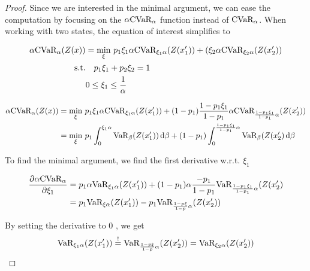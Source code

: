\begin{proof}
Since we are interested in the minimal argument, we can ease the computation by focusing on the $\alpha\text{CVaR}_\alpha$ function instead of $\text{CVaR}_\alpha$.
When working with two states, the equation of interest simplifies to

\begin{equation}\label{eqn:cvardecomp2}
\begin{split}
\alpha\text{CVaR}_\alpha(Z(x))&=\min_{\xi} \, p_1\xi_1\alpha \text{CVaR}_{\xi_1\alpha}(Z(x_1')) + (\xi_2\alpha\text{CVaR}_{\xi_2\alpha}(Z(x_2'))\\
\text{s.t.}& \quad p_1\xi_1 + p_2\xi_2 = 1\\
& 0 \le \xi_1 \le \frac{1}{\alpha}
\end{split}
\end{equation}

\begin{equation}\label{eqn:cvardecomp3}
\begin{split}
\alpha\text{CVaR}_\alpha(Z(x))&=\min_{\xi} \, p_1\xi_1\alpha \text{CVaR}_{\xi_1\alpha}(Z(x_1')) + (1-p_1)\dfrac{1-p_1\xi_1}{1-p_1}\alpha\text{CVaR}_{\frac{1-p_1\xi_1}{1-p_1}\alpha}(Z(x_2'))\\
&=\min_{\xi} \, p_1\int_0^{\xi_1\alpha}\text{VaR}_{\beta}(Z(x_1'))\,\text{d}\beta + (1-p_1)\int_0^{\frac{1-p_1\xi_1}{1-p_1}\alpha}\text{VaR}_{\beta}(Z(x_2')\,\text{d}\beta\\
\end{split}
\end{equation}

To find the minimal argument, we find the first derivative w.r.t. $\xi_1$

\begin{equation}
\begin{split}
\dfrac{\partial \alpha\text{CVaR}_\alpha}{\partial \xi_1} &= p_1\alpha \text{VaR}_{\xi_1\alpha}(Z(x_1')) + (1-p_1)\alpha\dfrac{-p_1}{1-p_1}\text{VaR}_{\frac{1-p_1\xi_1}{1-p_1}\alpha}(Z(x_2')\\
&= p_1\text{VaR}_{\xi\alpha}(Z(x_1')) - p_1\text{VaR}_{\frac{1-p\xi}{1-p}\alpha}(Z(x_2'))
\end{split}
\end{equation}

By setting the derivative to 0 , we get
\begin{equation}
\text{VaR}_{\xi_1\alpha}(Z(x_1')) \overset{!}{=} \text{VaR}_{\frac{1-p\xi}{1-p}\alpha}(Z(x_2')) = \text{VaR}_{\xi_2\alpha}(Z(x_2'))
\end{equation}


\end{proof}
